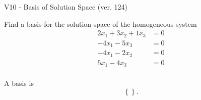 \begin{exercise}
  \begin{exerciseTitle}V10 - Basis of Solution Space (ver. 124)\end{exerciseTitle}
  \begin{exerciseStatement}
    Find a basis for the solution space of the homogeneous system 
\begin{align*}
 2 x_ 1 + 3 x_ 2 + 1 x_ 3 &= 0  \\ 
  -4 x_ 1 -5 x_ 3 &= 0  \\ 
  -4 x_ 1 -2 x_ 2 &= 0  \\ 
  5 x_ 1 -4 x_ 3 &= 0  \\ 
 \end{align*}


 
  \end{exerciseStatement}

  \begin{exerciseAnswer}
   A basis is   
\[\left\{\right\}.\]

  


  \end{exerciseAnswer}
\end{exercise}